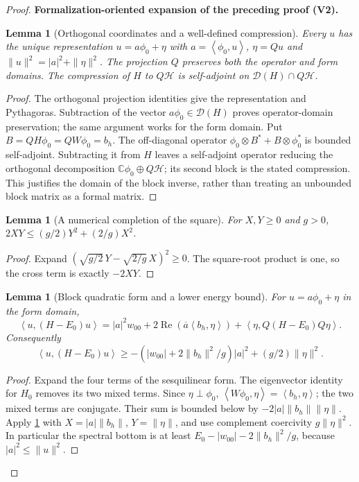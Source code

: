 \documentclass[11pt]{article}
\newtheorem{lemma}[theorem]{Lemma}
\newcommand{\formalisationparentid}{X}
\newenvironment{formalisationaddition}[1]{\par\medskip\begingroup\color{blue}\def\formalisationparentid{#1}\setcounter{formalizationsublemma}{0}\let\lemma\formalizationsublemma\let\endlemma\endformalizationsublemma
  \def\Eo{\mathcal E_h^\circ}\def\EE{\mathcal E_h}\def\phio{\phi_h^\circ}\def\phih{\phi_h}\def\Ho{H_h^{\rm atom}(v^\circ)}\def\Ha{H_h^{\rm atom}}\def\HL{H_h^{L}}\def\Dh{D_h}\def\Log{\operatorname{Log}}\def\ellh{\ell_h}\def\Gp{G_{p,h}}\def\Ast{A_{*,h}}\def\ahat{\widehat{\mathfrak a}_h}\def\ah{\mathfrak a_h}\def\rh{\widehat\rho_h}\def\deltah{\widehat\delta_h}\def\oldref##1{\textup{(##1)}}\def\interface##1{\par\noindent\textit{Analytical interface used here.} ##1\par}\def\finish{\par\noindent\textit{Conclusion of the formalization-oriented expansion.} }\par\noindent\textbf{Formalization-oriented expansion of the preceding proof (V2).}\par\smallskip
}{\par\endgroup\medskip
}
\newcommand{\C}{\mathbb C}
\newcommand{\ip}[2]{\left\langle #1,#2\right\rangle}
\newcommand{\Rea}{\operatorname{Re}}
\begin{document}
\begin{proof}
\begin{formalisationaddition}{P3.2}
\begin{lemma}[Orthogonal coordinates and a well-defined compression]\label{sublemma:P3-2-domain-coordinates}
Every $u$ has the unique representation $u=a\phi_0+\eta$ with
$a=\ip{\phi_0}u$, $\eta=Qu$ and
$\|u\|^2=|a|^2+\|\eta\|^2$. The projection $Q$ preserves both the
operator and form domains. The compression of $H$ to $Q\mathcal H$ is
self-adjoint on $\mathcal D(H)\cap Q\mathcal H$.
\end{lemma}
\begin{proof}
The orthogonal projection identities give the representation and
Pythagoras. Subtraction of the vector $a\phi_0\in\mathcal D(H)$ proves
operator-domain preservation; the same argument works for the form domain.
Put $B=QH\phi_0=QW\phi_0=b_h$. The off-diagonal operator
$\phi_0\otimes B^*+B\otimes\phi_0^*$ is bounded self-adjoint.
Subtracting it from $H$ leaves a self-adjoint operator reducing the
orthogonal decomposition $\C\phi_0\oplus Q\mathcal H$; its second block
is the stated compression. This justifies the domain of the block inverse,
rather than treating an unbounded block matrix as a formal matrix.
\end{proof}

\begin{lemma}[A numerical completion of the square]\label{sublemma:P3-2-young}
For $X,Y\ge0$ and $g>0$,
$2XY\le(g/2)Y^2+(2/g)X^2$.
\end{lemma}
\begin{proof}
Expand $(\sqrt{g/2}\,Y-\sqrt{2/g}\,X)^2\ge0$.
The square-root product is one, so the cross term is exactly $-2XY$.
\end{proof}

\begin{lemma}[Block quadratic form and a lower energy bound]\label{sublemma:P3-2-block-form}
For $u=a\phi_0+\eta$ in the form domain,
\[
 \ip u{(H-E_0)u}=|a|^2w_{00}
 +2\Rea(\overline a\ip{b_h}\eta)
 +\ip\eta{Q(H-E_0)Q\eta}.
\]
Consequently
\[
 \ip u{(H-E_0)u}\ge
 -\left(|w_{00}|+2\|b_h\|^2/g\right)|a|^2+(g/2)\|\eta\|^2.
\]
\end{lemma}
\begin{proof}
Expand the four terms of the sesquilinear form. The eigenvector identity
for $H_0$ removes its two mixed terms. Since $\eta\perp\phi_0$,
$\ip{W\phi_0}\eta=\ip{b_h}\eta$; the two mixed terms are conjugate.
Their sum is bounded below by $-2|a|\|b_h\|\|\eta\|$.
Apply \ref{sublemma:P3-2-young} with $X=|a|\|b_h\|$, $Y=\|\eta\|$,
and use complement coercivity $g\|\eta\|^2$.
In particular the spectral bottom is at least
$E_0-|w_{00}|-2\|b_h\|^2/g$, because $|a|^2\le\|u\|^2$.
\end{proof}


\end{formalisationaddition}
\end{proof}
\end{document}
